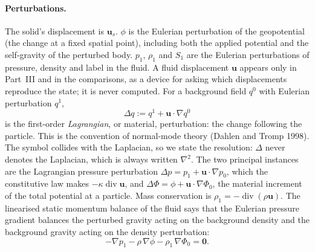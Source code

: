 \documentclass[11pt]{article}
\theoremstyle{definition}
\theoremstyle{remark}
\newcommand{\bu}{\mathbf{u}}
\newcommand{\Div}{\operatorname{div}}
\begin{document}
\paragraph{Perturbations.} The solid's displacement is $\bu_s$. $\phi$
is the Eulerian perturbation of the geopotential (the change at a
fixed spatial point), including both the applied potential and the
self-gravity of the perturbed body. $p_1$, $\rho_1$ and $S_1$ are the
Eulerian perturbations of pressure, density and label in the fluid. A
fluid displacement $\bu$ appears only in Part~III and in the
comparisons, as a device for asking which displacements reproduce the
state; it is never computed. For a background field $q^0$ with
Eulerian perturbation $q^1$,
\begin{equation*}
  \Delta q := q^1 + \bu\cdot\nabla q^0
\end{equation*}
is the first-order \emph{Lagrangian}, or material, perturbation: the
change following the particle. This is the convention of normal-mode
theory (Dahlen and Tromp 1998). The symbol collides with the
Laplacian, so we state the resolution: $\Delta$ never denotes the
Laplacian, which is always written $\nabla^2$. The two principal
instances are the Lagrangian pressure perturbation $\Delta p = p_1 +
\bu\cdot\nabla p_0$, which the constitutive law makes $-\kappa\Div\bu$,
and $\Delta\Phi = \phi + \bu\cdot\nabla\Phi_0$, the material increment
of the total potential at a particle. Mass conservation is $\rho_1 =
-\Div(\rho\bu)$. The linearised static momentum balance of the fluid
says that the Eulerian pressure gradient balances the perturbed
gravity acting on the background density and the background gravity
acting on the density perturbation:
\begin{equation}
  -\nabla p_1 - \rho\,\nabla\phi - \rho_1\,\nabla\Phi_0 = \mathbf 0 .
  \label{eq:momentum}
\end{equation}
\end{document}

